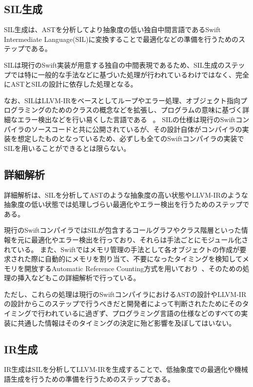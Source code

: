 \subsection{SIL生成}

SIL生成は、ASTを分析してより抽象度の低い独自中間言語であるSwift Intermediate Language(SIL)に変換することで最適化などの準備を行うためのステップである。

SILは現行のSwift実装が用意する独自の中間表現であるため、SIL生成のステップでは特に一般的な手法などに基づいた処理が行われているわけではなく、完全にASTとSILの設計に依存した処理となる。

なお、SILはLLVM-IRをベースとしてループやエラー処理、オブジェクト指向プログラミングのためのクラスの概念などを拡張し、プログラムの意味に基づく詳細なエラー検出などを行い易くした言語である ~\cite{sil}。
SILの仕様は現行のSwiftコンパイラのソースコードと共に公開されているが、その設計自体がコンパイラの実装を想定したものとなっているため、必ずしも全てのSwiftコンパイラの実装でSILを用いることができるとは限らない。

\subsection{詳細解析}

詳細解析は、SILを分析してASTのような抽象度の高い状態やLLVM-IRのような抽象度の低い状態では処理しづらい最適化やエラー検出を行うためのステップである。

現行のSwiftコンパイラではSILが包含するコールグラフやクラス階層といった情報を元に最適化やエラー検出を行っており、それらは手法ごとにモジュール化されている。
また、Swiftではメモリ管理の手法として各オブジェクトの作成が要求された際に自動的にメモリを割り当て、不要になったタイミングを検知してメモリを開放するAutomatic Reference Counting方式を用いており~\cite{arc}、そのための処理の挿入などもこの詳細解析で行っている。

ただし、これらの処理は現行のSwiftコンパイラにおけるASTの設計やLLVM-IRの設計からこのステップで行うべきだと開発者によって判断されたためにそのタイミングで行われているに過ぎず、プログラミング言語の仕様などのすべての実装に共通した情報はそのタイミングの決定に殆ど影響を及ぼしてはいない。

\subsection{IR生成}

IR生成はSILを分析してLLVM-IRを生成することで、低抽象度での最適化や機械語生成を行うための準備を行うためのステップである。

